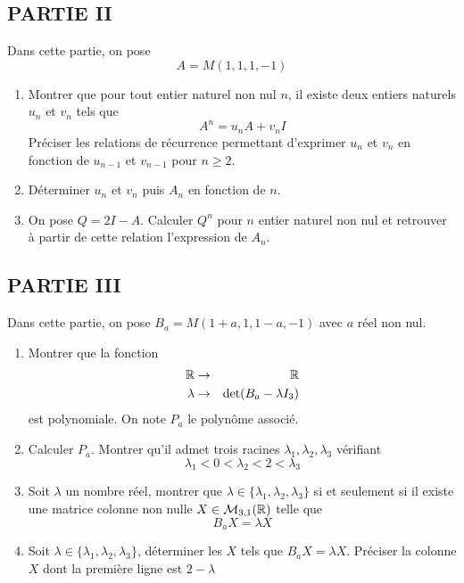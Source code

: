\subsection*{PARTIE II}
Dans cette partie, on pose 
\begin{displaymath}
 A = M(1,1,1,-1)
\end{displaymath}
\begin{enumerate}
 \item Montrer que pour tout entier naturel non nul $n$, il existe deux entiers naturels $u_n$ et $v_n$ tels que 
\begin{displaymath}
 A^n = u_n A + v_n I
\end{displaymath}
Préciser les relations de récurrence permettant d'exprimer $u_n$ et $v_n$ en fonction de $u_{n-1}$ et $v_{n-1}$ pour $n\geq 2$.
\item Déterminer $u_n$ et $v_n$ puis $A_n$ en fonction de $n$.
\item On pose $Q = 2I -A$. Calculer $Q^n$ pour $n$ entier naturel non nul et retrouver à partir de cette relation l'expression de $A_n$.
\end{enumerate}



\subsection*{PARTIE III}
Dans cette partie, on pose $B_{a}=M(1+a,1,1-a,-1)$ avec $a$ réel non nul.
\begin{enumerate}
\item Montrer que la fonction
\begin{eqnarray*}
	\mathbb{R} &\rightarrow& \mathbb{R}\\
	\lambda &\rightarrow& \det (B_{a}-\lambda I_{3})
\end{eqnarray*}
est polynomiale. On note $P_{a}$ le polynôme associé.
\item Calculer $P_{a}$. Montrer qu'il admet trois racines $\lambda_{1},\lambda_{2},\lambda_{3}$ vérifiant
$$\lambda_{1}<0< \lambda_{2}<2<\lambda_{3}$$

\item Soit $\lambda$ un nombre réel, montrer que $\lambda \in \{\lambda_{1},\lambda_{2},\lambda_{3}\}$ si et seulement si il existe une matrice colonne non nulle $X \in \mathcal{M}_{3,1}(\mathbb{R})$ telle que $$B_{a}X=\lambda X$$

\item Soit $\lambda \in \{\lambda_{1},\lambda_{2},\lambda_{3}\}$, déterminer les $X$ tels que $B_{a}X=\lambda X$. Préciser la colonne $X$ dont la première ligne est $2-\lambda$
\end{enumerate}

